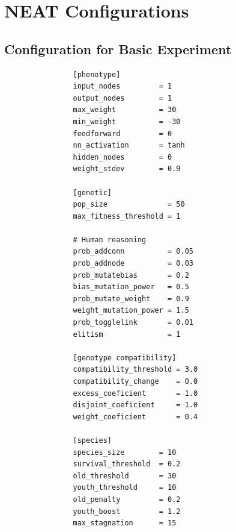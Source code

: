 \documentclass[11pt]{article}
\begin{document}
	\section{NEAT Configurations} %
	\label{sec:neat_configurations}
	
		\subsection{Configuration for Basic Experiment} %
		\label{sub:configuration_for_basic_experiment}
			\begin{verbatim}
				[phenotype]
				input_nodes         = 1
				output_nodes        = 1
				max_weight          = 30
				min_weight          = -30
				feedforward         = 0
				nn_activation       = tanh 
				hidden_nodes        = 0
				weight_stdev        = 0.9

				[genetic]
				pop_size              = 50
				max_fitness_threshold = 1

				# Human reasoning
				prob_addconn          = 0.05
				prob_addnode          = 0.03
				prob_mutatebias       = 0.2
				bias_mutation_power   = 0.5
				prob_mutate_weight    = 0.9
				weight_mutation_power = 1.5
				prob_togglelink       = 0.01
				elitism               = 1

				[genotype compatibility]
				compatibility_threshold = 3.0
				compatibility_change    = 0.0
				excess_coeficient       = 1.0
				disjoint_coeficient     = 1.0
				weight_coeficient       = 0.4

				[species]
				species_size        = 10
				survival_threshold  = 0.2
				old_threshold       = 30
				youth_threshold     = 10
				old_penalty         = 0.2
				youth_boost         = 1.2
				max_stagnation      = 15
			\end{verbatim}

		\pagebreak
\end{document}

